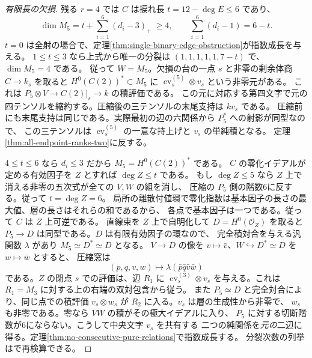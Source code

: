 \begin{proof}[有限長の欠損]
残る $r=4$ では $C$ は捩れ長 $t=12-\deg E\le6$ であり、
\[
 \dim M_5=t+\sum_{i=1}^6(d_i-3)_+\ \ge4,\qquad
 \sum_{i=1}^6(d_i-1)=6-t .
\]
$t=0$ は全射の場合で、定理\ref{thm:single-binary-edge-obstruction}が指数成長を与える。
$1\le t\le3$ なら上式から唯一の分裂は $(1,1,1,1,1,7-t)$ で、$\dim M_5=4$ である。
従って $W=M_5$。欠損の台の一点 $s$ と非零の剰余体商 $C\to k_s$ を取ると
$H^0(C(2))^*\subset M_5$ に $\operatorname{ev}_s^{(5)}\otimes v_s$ という非零元がある。
これは $P_5\otimes V\to C(2)|_s\to k$ の積評価である。
この元に対応する第四文字で元の四テンソルを縮約する。圧縮後の三テンソルの末尾支持は $kv_s$ である。
圧縮前にも末尾支持は同じである。実際最初の辺の六関係から $P_5^*$ への射影が同型なので、
この三テンソルは $\operatorname{ev}_s^{(5)}$ の一意な持上げと $v_s$ の単純積となる。
定理\ref{thm:all-endpoint-ranks-two}に反する。

$4\le t\le6$ なら $d_i\le3$ だから $M_5=H^0(C(2))^*$ である。
$C$ の零化イデアルが定める有効因子を $Z$ とすれば $\deg Z\le t$ である。
もし $\deg Z\le5$ なら $Z$ 上で消える非零の五次式が全ての $V,W$ の組を消し、
圧縮の $P_5$ 側の階数6に反する。従って $t=\deg Z=6$。
局所の離散付値環で零化指数は基本因子の長さの最大値、層の長さはそれらの和であるから、
各点で基本因子は一つである。従って $C$ は $Z$ 上可逆である。
直線束を $Z$ 上で自明化して $D=H^0(\mathcal O_Z)$ を取ると
$P_5\to D$ は同型である。$D$ は有限有効因子の環なので、
完全積対合を与える汎関数 $\lambda$ があり $M_5\simeq D^*\simeq D$ となる。
$V\to D$ の像を $v\mapsto\bar v$、$W\hookrightarrow D^*\simeq D$ を $w\mapsto\bar w$ とすると、
圧縮窓は
\[
                (p,q,v,w)\longmapsto \lambda(\bar p\bar q\bar v\bar w)
\]
である。$Z$ の閉点 $s$ での評価は、辺 $R_1$ に
$\operatorname{ev}_s^{(3)}\otimes v_s$ を与える。これは $R_1=M_3$ に対する上の右端の双対包含から従う。
また $P_5\simeq D$ と完全対合により、同じ点での積評価
$v_s\otimes w_s$ が $R_2$ に入る。$v_s$ は層の生成性から非零で、
$w_s$ も非零である。零なら $\bar V\bar W$ の積がその極大イデアルに入り、
$P_5$ に対する切断階数が6にならない。こうして中央文字 $v_s$ を共有する
二つの純関係を\emph{元の}二辺に得る。定理\ref{thm:no-consecutive-pure-relations}で指数成長する。
分裂次数の列挙はで再検算できる。
\end{proof}
